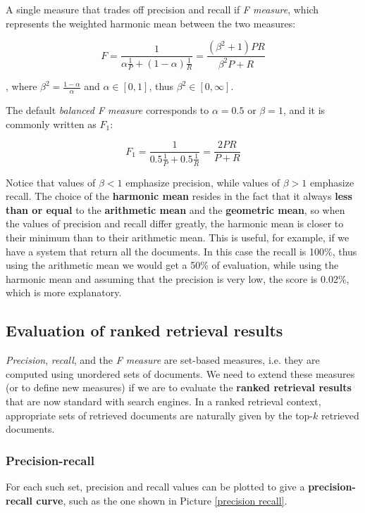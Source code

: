 A single measure that trades off precision and recall if \textit{F measure}, which represents the weighted harmonic mean between the two measures:

$$
F = \frac{1}{\alpha \frac{1}{P} + (1 - \alpha) \frac{1}{R}} = \frac{(\beta^2 + 1)PR}{\beta^2 P + R}
$$

, where $\beta^2 = \frac{1 - \alpha}{\alpha}$ and $\alpha \in [0,1]$, thus $\beta^2 \in [0, \infty]$. 

The default \textit{balanced F measure} corresponds to $\alpha = 0.5$ or $\beta = 1$, and it is commonly written as $F_1$:

$$
F_1 = \frac{1}{0.5 \frac{1}{P} + 0.5 \frac{1}{R}} = \frac{2 P R}{P + R}
$$

Notice that values of $\beta < 1$ emphasize precision, while values of $\beta > 1$ emphasize recall. The choice of the \textbf{harmonic mean} resides in the fact that it always \textbf{less than or equal} to the \textbf{arithmetic mean} and the \textbf{geometric mean}, so when the values of precision and recall differ greatly, the harmonic mean is closer to their minimum than to their arithmetic mean. This is useful, for example, if we have a system that return all the documents. In this case the recall is 100\%, thus using the arithmetic mean we would get a 50\% of evaluation, while using the harmonic mean and assuming that the precision is very low, the score is 0.02\%, which is more explanatory.

\subsection{Evaluation of ranked retrieval results}
\textit{Precision}, \textit{recall}, and the \textit{F measure} are set-based measures, i.e. they are computed using unordered sets of documents. We need to extend these measures (or to define new measures) if we are to evaluate the \textbf{ranked retrieval results} that are now standard with search engines. In a ranked retrieval context, appropriate sets of retrieved documents are naturally given by the top-$k$ retrieved documents. 

\subsubsection{Precision-recall}

For each such set, precision and recall values can be plotted to give a \textbf{precision-recall curve}, such as the one shown in Picture \ref{precision recall}. 

